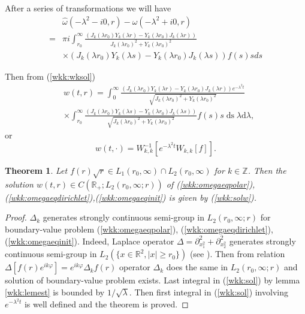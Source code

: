 \documentclass[manuscript, printscheme]{paper}
\newtheorem{thm}{Theorem}[section]
\newcommand{\RM}{\mathbb{R}}
\newcommand{\ZM}{\mathbb{Z}}
\newcommand{\ds}{\operatorname{ds}}
\begin{document}
After a series of transformations we will have
\begin{align*}&\hat \omega(-\lambda^2-i0,r) - \hat \omega(-\lambda^2+i0,r)\\
=&\pi i \int_{r_0}^\infty  \frac{ \left (J_{k}(\lambda r_0) Y_k(\lambda r) - Y_{k}(\lambda r_0) J_k(\lambda r) \right )
 } {J_{k}(\lambda r_0)^2 + Y_{k}(\lambda r_0)^2} \\
&\times \left ( J_{k}(\lambda r_0) Y_k(\lambda s) - Y_{k}(\lambda r_0) J_k(\lambda s) \right )  f(s) s ds  
\end{align*}

Then from (\ref{wkk:wksol})
\begin{align}\label{wkk:sol}
&w(t,r) = 
\int_0^\infty  \frac{  \left (J_{k}(\lambda r_0) Y_k(\lambda r) - Y_{k}(\lambda r_0) J_k(\lambda r)  \right )e^{-\lambda^2 t}} 
{\sqrt{J_{k}(\lambda r_0)^2 + Y_{k}(\lambda r_0)^2}}  \\ 
&\times \int_{r_0}^\infty
 \frac{ \left (J_{k}(\lambda r_0) Y_k(\lambda s) - Y_{k}(\lambda r_0) J_k(\lambda s) \right )}{\sqrt{J_{k}(\lambda r_0)^2 + Y_{k}(\lambda r_0)^2}} f(s) s \ds \lambda \mathrm{d}\lambda, \nonumber
\end{align}
or
\begin{equation}\label{wkk:solw}
w(t,\cdot) = W^{-1}_{k,k}\left [ e^{-\lambda^2 t} W_{k,k}[f] \right ].
\end{equation}


\begin{thm} \label{wkk:thmheateq}
Let $f(r) \sqrt r \in L_1(r_0,\infty) \cap L_2(r_0,\infty)$ for $k \in \ZM$. Then the solution $w(t,r)\in C\left(\RM_+;L_2(r_0,\infty; r)\right )$ of (\ref{wkk:omegaeqpolar}), (\ref{wkk:omegaeqdirichlet}),(\ref{wkk:omegaeqinit}) is given by (\ref{wkk:solw}).
\end{thm}

\begin{proof} 
$\Delta_k$ generates strongly continuous semi-group in $L_2(r_0,\infty; r)$ for boundary-value problem (\ref{wkk:omegaeqpolar}), (\ref{wkk:omegaeqdirichlet}),(\ref{wkk:omegaeqinit}). Indeed, Laplace operator $\Delta=\partial^2_{x_1^2}+\partial^2_{x_2^2}$  generates strongly continuous semi-group in $L_2(\{x\in \RM^2,|x|\geq r_0\})$ (see \cite{Yosida}). Then from relation
$\Delta [f(r)e^{ik\varphi}] = e^{ik\varphi} \Delta_k f(r)$ operator $\Delta_k$ does the same in $L_2(r_0,\infty; r)$ and solution of boundary-value problem exists. Last integral in (\ref{wkk:sol}) by lemma \ref{wkk:lemest} is bounded by $1/\sqrt \lambda$. Then first integral in  (\ref{wkk:sol}) involving $e^{-\lambda^2 t}$ is well defined and the theorem is proved. 
\end{proof}
\end{document}
